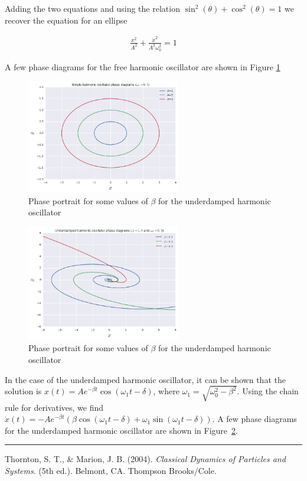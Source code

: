 \documentclass[10pt,letterpaper]{article}
\begin{document}
\noindent
Adding the two equations and using the 
relation $\sin^2(\theta) + \cos^2(\theta) = 1$ we recover the equation for
an ellipse

\begin{align*}
    \frac{x^2}{A^2} + \frac{\dot{x}^2}{A^2 \omega_0^2} = 1
\end{align*}

\noindent
A few phase diagrams for the free harmonic oscillator are shown in Figure \ref{fig:free}

\begin{figure}[h!]
\begin{center}
    \includegraphics[width=0.6\textwidth]{figures/free-sho.png}
\end{center}
\caption{Phase portrait for some values of $\beta$ for the underdamped harmonic oscillator}
\label{fig:free}
\end{figure}

\begin{figure}[h!]
\begin{center}
    \includegraphics[width=0.6\textwidth]{figures/underdamped-sho.png}
\end{center}
\caption{Phase portrait for some values of $\beta$ for the underdamped harmonic oscillator}
\label{fig:underdamped}
\end{figure}

In the case of the underdamped harmonic oscillator, it can be shown that
the solution is $x(t) = Ae^{-\beta t}\cos(\omega_1 t - \delta)$, where
$\omega_1 = \sqrt{\omega_0^2 - \beta^2}$. Using the chain rule for derivatives,
we find $\dot{x}(t) 
= -Ae^{-\beta t} (\beta \cos(\omega_1 t - \delta) 
+ \omega_1 \sin(\omega_1 t - \delta))$. A few phase diagrams for the underdamped
harmonic oscillator are shown in Figure~\ref{fig:underdamped}.



\rule{\textwidth}{1pt}

Thornton, S. T., \& Marion, J. B. (2004). \textit{Classical Dynamics of Particles and Systems}.
(5th ed.). Belmont, CA. Thompson Brooks/Cole.
\end{document}
